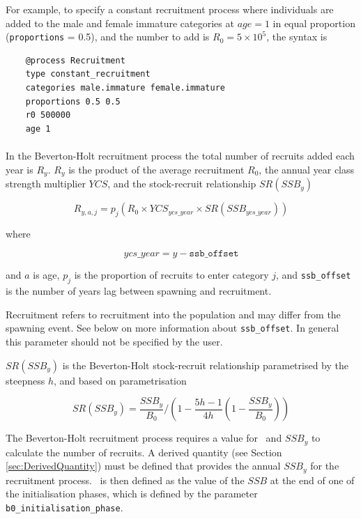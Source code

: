 For example, to specify a constant recruitment process where individuals are added to the male and female immature categories at $age=1$ in equal proportion (\texttt{proportions} = 0.5), and the number to add is $R_0=5 \times 10^5$, the syntax is

{\small{\begin{verbatim}
	@process Recruitment
	type constant_recruitment
	categories male.immature female.immature
	proportions 0.5 0.5
	r0 500000
	age 1
\end{verbatim}}}

\paragraph{}\label{sec:Process-RecruitmentBevertonHolt}

In the Beverton-Holt recruitment process the total number of recruits added each year is $R_y$. $R_y$ is the product of the average recruitment $R_0$, the annual year class strength multiplier $YCS$, and the stock-recruit relationship $SR(SSB_y)$

\begin{equation}\label{eq:BH}
  R_{y,a,j} = p_j(R_0 \times YCS_{ycs\_year} \times SR(SSB_{ycs\_year}))
\end{equation}

where

\begin{equation}\label{eq:year_class}
ycs\_year = y - \texttt{ssb\_offset}
\end{equation}

and $a$ is age, $p_j$ is the proportion of recruits to enter category $j$, and \texttt{ssb\_offset} is the number of years lag between spawning and recruitment.

Recruitment refers to recruitment into the population and may differ from the spawning event. See below on more information about \texttt{ssb\_offset}. In general this parameter should not be specified by the user.

$SR(SSB_y)$ is the Beverton-Holt stock-recruit relationship parametrised by the steepness $h$, and based on \cite{mace_doonan_88} parametrisation

\begin{equation}\label{eq:BH_SR}
SR(SSB_y) = \frac{SSB_y}{B_0} / \left( 1-\frac{5h-1}{4h} \left( 1-\frac{SSB_y}{B_0} \right) \right)
\end{equation}

The Beverton-Holt recruitment process requires a value for \Bzero\ and $SSB_y$ to calculate the number of recruits. A derived quantity (see Section \ref{sec:DerivedQuantity}) must be defined that provides the annual $SSB_y$ for the recruitment process. \Bzero\ is then defined as the value of the $SSB$ at the end of one of the initialisation phases, which is defined by the parameter \texttt{b0\_initialisation\_phase}.

